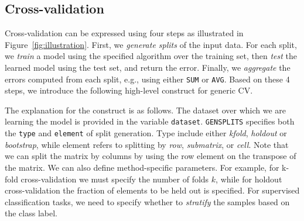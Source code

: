 \documentclass{vldb}
\begin{document}
\subsection{Cross-validation}
Cross-validation can be expressed using four steps as
illustrated in Figure~\ref{fig:illustration}.
First, we \emph{generate splits} of the input data.
For each split, we \emph{train} a model using the specified algorithm
over the training set, then \emph{test} the learned model
using the test set, and return the error.
Finally, we \emph{aggregate} the errors computed from each split,
e.g., using either {\tt SUM} or {\tt AVG}.
Based on these 4 steps, we introduce the following high-level construct
for generic CV. \\
\begin{center}
\end{center}

The explanation for the construct is as follows.
The dataset over which we are learning the model is provided in the variable {\tt dataset}.
{\tt GENSPLITS} specifies both the {\tt type} and {\tt element} of split generation.
Type include either {\em kfold}, {\em holdout} or {\em bootstrap}, while
element refers to splitting by {\em row}, {\em submatrix}, or {\em cell}.
Note that we can split the matrix by columns by using the row element on the transpose of the matrix.
We can also define method-specific parameters.
For example, for k-fold cross-validation we must specify the number of folds $k$,
while for holdout cross-validation the fraction of elements to be held out is specified.
For supervised classification tasks, we need to specify whether to {\em stratify}
the samples based on the class label.
\end{document}
